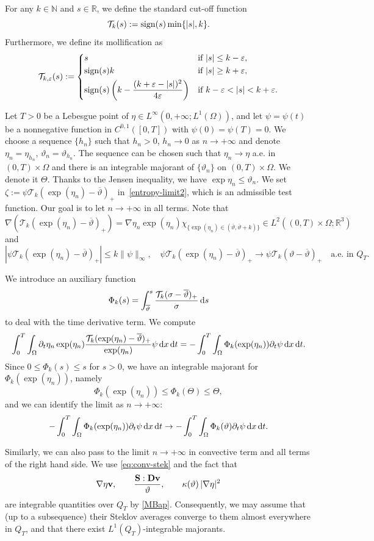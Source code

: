 \documentclass[11pt, a4paper, reqno]{amsart}
\newcommand{\N}{\mathbb N}
\newcommand{\R}{{\mathbb R}}
\newcommand{\Fk}{\Phi_k}
\numberwithin{equation}{section}
\newcommand{\dert}{\partial_t}
\newcommand{\vc}[1]{{\bf #1}}
\newcommand{\vv}{\vc{v}}
\newcommand{\thet}{\vartheta}
\renewcommand{\S}{\mathbf{S}}
\newcommand{\D}{\mathbf{D}}
\newcommand{\dt}{\,{\rm d} t }
\newcommand{\dd}{\,{\rm d} }
\newcommand{\dx}{\,{\rm d} {x}}
\newcommand{\dxdt}{\dx  \dt}
\newcommand{\etan}{\eta_n}
\newcommand{\QT}{Q_T}
\newcommand{\intTO}[1]{\int_0^T \int_{\Omega} #1  \dxdt}
\newcommand{\nm}[1]{\|#1\|}
\newcommand{\T}{\mathcal{T}}
\newcommand{\tmax}{\overline{\thet}}
\begin{document}
For any $k\in \N$ and $s\in\R$, we define the standard cut-off function
$$
\mathcal{T}_k(s):={\rm sign}(s) \min\{|s|,k\}.
$$
Furthermore, we define its mollification as
$$
\mathcal{T}_{k,\varepsilon}(s):= \left\{ \begin{aligned}
&s &&\textrm{if }|s|\le k-\varepsilon,\\
&{\rm sign}(s) k &&\textrm{if } |s|\ge k+\varepsilon,\\
&{\rm sign}(s) \left( k - \frac{(k+\varepsilon - |s|)^2}{4\varepsilon} \right) &&\textrm{if }  k-\varepsilon < |s| < k+\varepsilon.
\end{aligned}
\right.
$$


Let $T>0$ be a Lebesgue point of $\eta\in L^\infty(0,+\infty; L^1(\Omega))$, and let $\psi=\psi(t)$ be a nonnegative function in $C^{0,1}([0,T])$ with $\psi(0)=\psi(T)=0$.
We choose a sequence $\{h_n\}$ such that $h_n>0$, $h_n\to 0$ as $n\to+\infty$ and denote $\eta_n=\eta_{h_n}$, $\thet_n=\thet_{h_n}$. The sequence can be chosen such that $\eta_n\to\eta$ a.e. in $(0,T)\times\Omega$ and there is an integrable majorant of $\{\thet_n\}$ on $(0,T)\times\Omega$. We denote it $\Theta$. Thanks to the Jensen inequality, we have  $\exp \eta_n\leq \thet_n$. 
We set $\zeta:=\psi\T_k(\exp(\etan)-\tmax)_+$ in~\eqref{entropy-limit2}, which is an admissible test function. Our goal is to let $n\to +\infty$ in all terms.  Note that $\nabla(\T_k(\exp(\etan)-\tmax)_+)=\nabla\etan\exp(\etan)\chi_{\{\exp(\etan)\in(\tmax,\tmax+k)\}}\in L^2((0,T)\times\Omega; \R^3)$ and 
\begin{equation}\label{eq:conv-stek}
  |\psi\T_k(\exp(\etan)-\tmax)_+|\leq k\nm{\psi}_\infty,\quad \psi\T_k(\exp(\etan)-\tmax)_+\to \psi\T_k(\thet-\tmax)_+\quad\mbox{a.e. in $\QT$.}
\end{equation}

We introduce  an auxiliary function  
$$
\Fk(s)= \int_{\tmax}^s \frac{\T_k(\sigma-\tmax)_+}{\sigma}\dd s
$$
to deal with the time derivative term. We  compute
$$
\intTO{\dert\etan\exp(\etan)\frac{\T_k(\exp(\etan)-\tmax)_+}{\exp(\etan)}\psi}=-\intTO{\Fk(\exp(\etan))\dert\psi}.
$$
Since $0\leq\Phi_k(s)\leq s$ for $s>0$, we have an integrable majorant for $\Phi_k(\exp(\etan))$, namely
$$
\Phi_k(\exp(\etan))\leq\Phi_k(\Theta)\leq\Theta,
$$
and we can identify the limit as $n\to+\infty$:
$$
-\intTO{\Fk(\exp(\etan))\dert\psi}\to-\intTO{\Fk(\thet)\dert\psi}.
$$

Similarly, we can also pass to the limit $n\to+\infty$ in convective term and all terms of the right hand side. We use \eqref{eq:conv-stek} and the fact that 
$$
\nabla\eta \vv, \qquad  \frac{\S:\D{\vv}}{\thet}, \qquad \kappa(\thet)\,|\nabla \eta|^2
$$
are integrable quantities over $\QT$ by \eqref{MBap}. Consequently, we may assume that (up to a subsequence) their Steklov averages converge to them almost everywhere in $\QT$, and that there exist $L^1(\QT)$-integrable majorants.
\end{document}
